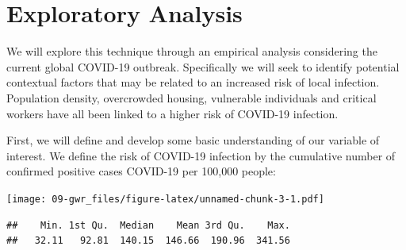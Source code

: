 \documentclass[
]{book}
\newenvironment{Shaded}{\begin{snugshade}}{\end{snugshade}}
\newcommand{\CommentTok}[1]{\textcolor[rgb]{0.56,0.35,0.01}{\textit{#1}}}
\newcommand{\DataTypeTok}[1]{\textcolor[rgb]{0.13,0.29,0.53}{#1}}
\newcommand{\DecValTok}[1]{\textcolor[rgb]{0.00,0.00,0.81}{#1}}
\newcommand{\FloatTok}[1]{\textcolor[rgb]{0.00,0.00,0.81}{#1}}
\newcommand{\KeywordTok}[1]{\textcolor[rgb]{0.13,0.29,0.53}{\textbf{#1}}}
\newcommand{\NormalTok}[1]{#1}
\newcommand{\OperatorTok}[1]{\textcolor[rgb]{0.81,0.36,0.00}{\textbf{#1}}}
\newcommand{\StringTok}[1]{\textcolor[rgb]{0.31,0.60,0.02}{#1}}
\begin{document}
\hypertarget{exploratory-analysis}{%
\section{Exploratory Analysis}\label{exploratory-analysis}}

We will explore this technique through an empirical analysis considering the current global COVID-19 outbreak. Specifically we will seek to identify potential contextual factors that may be related to an increased risk of local infection. Population density, overcrowded housing, vulnerable individuals and critical workers have all been linked to a higher risk of COVID-19 infection.

First, we will define and develop some basic understanding of our variable of interest. We define the risk of COVID-19 infection by the cumulative number of confirmed positive cases COVID-19 per 100,000 people:

\begin{Shaded}
\end{Shaded}

\texttt{[image: 09-gwr\_files/figure-latex/unnamed-chunk-3-1.pdf]}

\begin{Shaded}
\end{Shaded}

\begin{verbatim}
##    Min. 1st Qu.  Median    Mean 3rd Qu.    Max. 
##   32.11   92.81  140.15  146.66  190.96  341.56
\end{verbatim}
\end{document}
